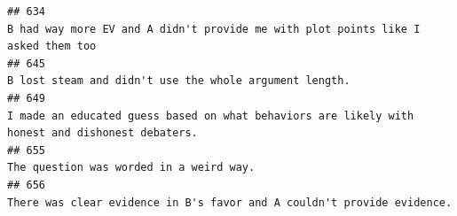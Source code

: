 \documentclass[
]{article}
\begin{document}
\begin{verbatim}
## 634                                                                                                                                                                                                                                                                                                                                                                                                                                                                                                                   B had way more EV and A didn't provide me with plot points like I asked them too
## 645                                                                                                                                                                                                                                                                                                                                                                                                                                                                                                                                             B lost steam and didn't use the whole argument length.
## 649                                                                                                                                                                                                                                                                                                                                                                                                                                                                                                    I made an educated guess based on what behaviors are likely with honest and dishonest debaters.
## 655                                                                                                                                                                                                                                                                                                                                                                                                                                                                                                                                                            The question was worded in a weird way.
## 656                                                                                                                                                                                                                                                                                                                                                                                                                                                                                                                             There was clear evidence in B's favor and A couldn't provide evidence.

\end{verbatim}
\end{document}
